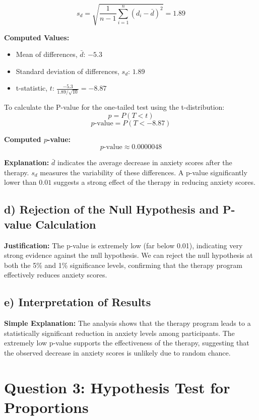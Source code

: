 \documentclass{article}
\begin{document}
\[
s_d = \sqrt{\frac{1}{n-1} \sum_{i=1}^{n} (d_i - \bar{d})^2} = 1.89
\]


\textbf{Computed Values:}
\begin{itemize}
    \item Mean of differences, \( \bar{d} \): $-5.3$
    \item Standard deviation of differences, \( s_d \): $1.89$
    \item t-statistic, \( t \): $ \frac{-5.3}{1.89 / \sqrt{10} } = -8.87$
\end{itemize}

To calculate the P-value for the one-tailed test using the t-distribution:
\[ p =  P(T < t) \]
\[ \text{$p$-value} = P(T < -8.87) \]

\textbf{Computed $p$-value:}
\[
\text{$p$-value}  \approx 0.0000048
\]

\textbf{Explanation:}
\(\bar{d}\) indicates the average decrease in anxiety scores after the therapy. \(s_d\) measures the variability of these differences. A p-value significantly lower than $0.01$ suggests a strong effect of the therapy in reducing anxiety scores.

\subsection*{d) Rejection of the Null Hypothesis and P-value Calculation}


\textbf{Justification:}
The p-value is extremely low (far below 0.01), indicating very strong evidence against the null hypothesis. We can reject the null hypothesis at both the 5\% and 1\% significance levels, confirming that the therapy program effectively reduces anxiety scores.

\subsection*{e) Interpretation of Results}

\textbf{Simple Explanation:}
The analysis shows that the therapy program leads to a statistically significant reduction in anxiety levels among participants. The extremely low p-value supports the effectiveness of the therapy, suggesting that the observed decrease in anxiety scores is unlikely due to random chance.


\newpage
\section*{Question 3: Hypothesis Test for Proportions}
\end{document}
